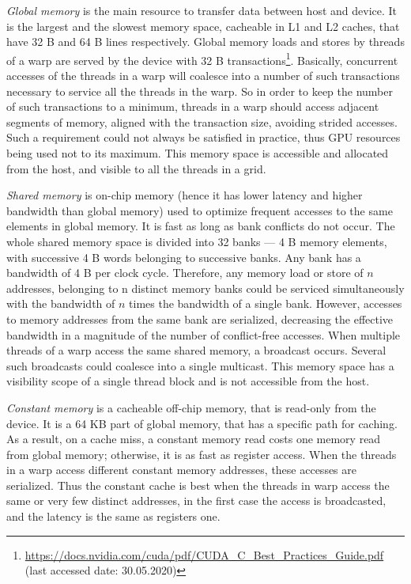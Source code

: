 \emph{Global memory} is the main resource to transfer data between host and device. It is the largest and the slowest memory space, cacheable in L1 and L2 caches, that have 32 B and 64 B lines respectively.
Global memory loads and stores by threads of a warp are served by the device with 32 B transactions\footnote{\url{https://docs.nvidia.com/cuda/pdf/CUDA\_C\_Best\_Practices\_Guide.pdf} (last accessed date: 30.05.2020)}.
Basically, concurrent accesses of the threads in a warp will coalesce into a number of such transactions necessary to service all the threads in the warp.
So in order to keep the number of such transactions to a minimum, threads in a warp should access adjacent segments of memory, aligned with the transaction size, avoiding strided accesses.
Such a requirement could not always be satisfied in practice, thus GPU resources being used not to its maximum. This memory space is accessible and allocated from the host, and visible to all the threads in a grid. 

\emph{Shared memory} is on-chip memory (hence it has lower latency and higher bandwidth than global memory) used to optimize frequent accesses to the same elements in global memory.
It is fast as long as bank conflicts do not occur.
The whole shared memory space is divided into 32 banks --- 4 B memory elements, with successive 4 B words belonging to successive banks. 
Any bank has a bandwidth of 4 B per clock cycle.
Therefore, any memory load or store of $n$ addresses, belonging to n distinct memory banks
could be serviced simultaneously with the bandwidth of $n$ times the bandwidth of a single bank.
However, accesses to memory addresses from the same bank are serialized, decreasing the effective bandwidth in a magnitude of the number of conflict-free accesses. When multiple threads of a warp access the same shared memory, a broadcast occurs. Several such broadcasts could coalesce into a single multicast. This memory space has a visibility scope of a single thread block and is not accessible from the host.

\emph{Constant memory} is a cacheable off-chip memory, that is read-only from the device. It is a 64 KB part of global memory, that has a specific path for caching. As a result, on a cache miss, a constant memory read costs one memory read from global memory; otherwise, it is as fast as register access. When the threads in a warp access different constant memory addresses, these accesses are serialized.  Thus the constant cache is best when the threads in warp access the same or very few distinct addresses, in the first case the access is broadcasted, and the latency is the same as registers one.

